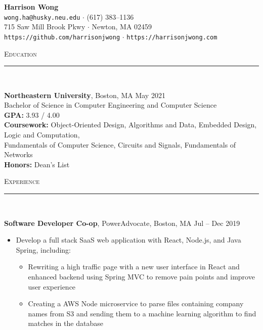 \documentclass[11pt]{article}
\begin{document}
\small
\center
	\textbf{\huge Harrison Wong}  \\
	\vspace{0.05in}
	\texttt{wong.ha@husky.neu.edu} $\cdot$ (617) 383--1136 \\
	715 Saw Mill Brook Pkwy $\cdot$ Newton, MA 02459 \\
	\texttt{https://github.com/harrisonjwong} $\cdot$ \texttt{https://harrisonjwong.com} \\
	
\begin{raggedright}

	\textsc{\Large Education} \\
	\vspace{-0.1in}
	\rule{\textwidth}{0.4pt} \\
	\vspace{0.05in}

	\textbf{\large Northeastern University}, Boston, MA 
	\hfill May 2021 \\
	Bachelor of Science in Computer Engineering and Computer Science \\
	\textbf{GPA:} \hspace{33pt} 3.93 / 4.00 \\
	\textbf{Coursework:} Object-Oriented Design, Algorithms and Data, Embedded Design, Logic and Computation, \\
	\hspace{64pt} Fundamentals of Computer Science, Circuits and Signals, Fundamentals of Networks \\
	\textbf{Honors:} \hspace {19pt} Dean's List
	\vspace{0.1in}
	
	\textsc{\Large Experience} \\
	\vspace{-0.1in}
	\rule{\textwidth}{0.4pt} \\
	\vspace{0.05in}
	
	\textbf{\large Software Developer Co-op}, PowerAdvocate, Boston, MA 
	\hfill Jul -- Dec 2019 \\
		\begin{itemize}
		\item Develop a full stack SaaS web application with React, Node.js, and Java Spring, including:
		\begin{itemize}
			\item Rewriting a high traffic page with a new user interface in React and enhanced backend using Spring MVC to remove pain points and improve user experience
			\item Creating a AWS Node microservice to parse files containing company names from S3 and sending them to a machine learning algorithm to find matches in the database
		\end{itemize}


\end{itemize}
\end{raggedright}
\end{document}
